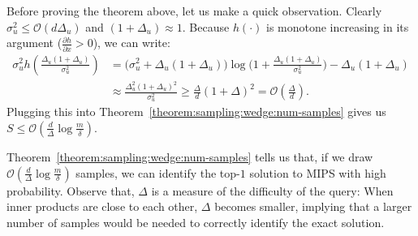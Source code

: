 Before proving the theorem above, let us make a quick observation.
Clearly $\sigma^2_u \leq \mathcal{O}(d \Delta_u)$ and $(1 + \Delta_u) \approx 1$.
Because $h(\cdot)$ is monotone increasing in its argument ($\frac{\partial h}{\partial x} > 0$),
we can write:
\begin{align*}
    \sigma^2_u h(\frac{\Delta_u (1 + \Delta_u)}{\sigma^2_u}) &=
        \big( \sigma^2_u + \Delta_u(1 + \Delta_u) \big) \log \big( 1 + \frac{\Delta_u (1 + \Delta_u)}{\sigma^2_u} \big) - \Delta_u(1 + \Delta_u) \\
    &\approx \frac{\Delta_u^2 (1 + \Delta_u)^2}{\sigma^2_u} \geq \frac{\Delta}{d} (1 + \Delta)^2
    = \mathcal{O}(\frac{\Delta}{d}).
\end{align*}
Plugging this into Theorem~\ref{theorem:sampling:wedge:num-samples} gives us
$S \leq \mathcal{O}(\frac{d}{\Delta} \log \frac{m}{\delta})$.

\begin{svgraybox}
    Theorem~\ref{theorem:sampling:wedge:num-samples} tells us that, if we draw
    $\mathcal{O}(\frac{d}{\Delta} \log \frac{m}{\delta})$ samples, we can identify the top-$1$
    solution to MIPS with high probability. Observe that, $\Delta$ is a measure of the
    difficulty of the query: When inner products are close to each other, $\Delta$
    becomes smaller, implying that a larger number of samples would be needed to correctly
    identify the exact solution.
\end{svgraybox}

